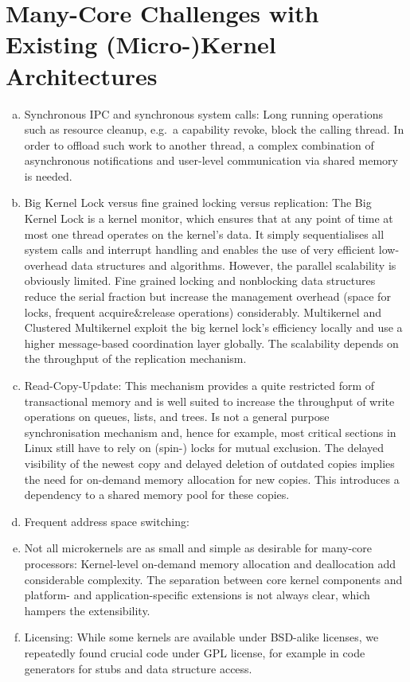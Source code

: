 \section{Many-Core Challenges with Existing (Micro-)Kernel Architectures}

\begin{enumerate}[(a)]
\item Synchronous IPC and synchronous system calls: Long running operations such as resource cleanup, e.g.\ a capability revoke, block the calling thread. In order to offload such work to another thread, a complex combination of asynchronous notifications and user-level communication via shared memory is needed.
\item Big Kernel Lock versus fine grained locking versus replication: The Big Kernel Lock is a kernel monitor, which ensures that at any point of time at most one thread operates on the kernel's data. It simply sequentialises all system calls and interrupt handling and enables the use of very efficient low-overhead data structures and algorithms. However, the parallel scalability is obviously limited. Fine grained locking and nonblocking data structures reduce the serial fraction but increase the management overhead (space for locks, frequent acquire\&release operations) considerably. Multikernel and Clustered Multikernel exploit the big kernel lock's efficiency locally and use a higher message-based coordination layer globally. The scalability depends on the throughput of the replication mechanism.
\item Read-Copy-Update: This mechanism provides a quite restricted form of transactional memory and is well suited to increase the throughput of write operations on queues, lists, and trees. Is not a general purpose synchronisation mechanism and, hence for example, most critical sections in Linux still have to rely on (spin-) locks for mutual exclusion. The delayed visibility of the newest copy and delayed deletion of outdated copies implies the need for on-demand memory allocation for new copies. This introduces a dependency to a shared memory pool for these copies.
\item Frequent address space switching: 
\item Not all microkernels are as small and simple as desirable for many-core processors: Kernel-level on-demand memory allocation and deallocation add considerable complexity. The separation between core kernel components and platform- and application-specific extensions is not always clear, which hampers the extensibility.
\item Licensing: While some kernels are available under BSD-alike licenses, we repeatedly found crucial code under GPL license, for example in code generators for stubs and data structure access.  
\end{enumerate}


